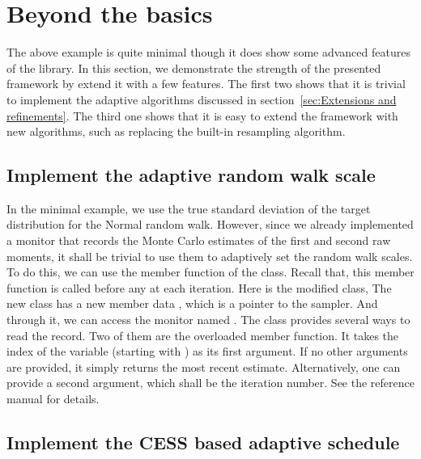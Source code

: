 \section{Beyond the basics}
\label{sec:Beyond the basics}

The above example is quite minimal though it does show some advanced features
of the \vsmc library. In this section, we demonstrate the strength of the
presented framework by extend it with a few features. The first two shows that
it is trivial to implement the adaptive algorithms discussed in
section~\ref{sec:Extensions and refinements}. The third one shows that it is
easy to extend the framework with new algorithms, such as replacing the
built-in resampling algorithm.

\subsection{Implement the adaptive random walk scale}
\label{sub:Implement the adaptive random walk scale}

In the minimal example, we use the true standard deviation of the target
distribution for the Normal random walk. However, since we already implemented
a monitor that records the Monte Carlo estimates of the first and second raw
moments, it shall be trivial to use them to adaptively set the random walk
scales. To do this, we can use the  member function
of the  class. Recall that, this member function is
called before any  at each iteration. Here is the
modified  class,
The new class has a new member data , which is a pointer
to the sampler. And through it, we can access the monitor named
. The  class provides several ways to
read the record. Two of them are the overloaded  member
function. It takes the index of the variable (starting with ) as
its first argument. If no other arguments are provided, it simply returns the
most recent estimate. Alternatively, one can provide a second argument, which
shall be the iteration number. See the reference manual for details.

\subsection{Implement the CESS based adaptive schedule}
\label{sub:Implement the CESS based adaptive schedule}

